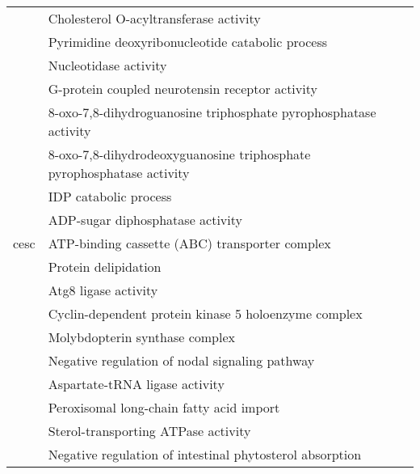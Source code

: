 \begin{appendices}
\begin{longtable}{lp{}}
									 & Cholesterol O-acyltransferase activity                                                          \\
									 & Pyrimidine deoxyribonucleotide catabolic process                                                \\
									 & Nucleotidase activity                                                                           \\
									 & G-protein coupled neurotensin receptor activity                                                 \\
									 & 8-oxo-7,8-dihydroguanosine triphosphate pyrophosphatase activity                                \\
									 & 8-oxo-7,8-dihydrodeoxyguanosine triphosphate pyrophosphatase activity                           \\
									 & IDP catabolic process                                                                           \\
									 & ADP-sugar diphosphatase activity                                                                \\
		\hline
		\gls{cesc}                   & ATP-binding cassette (ABC) transporter complex                                                  \\
									 & Protein delipidation                                                                            \\
									 & Atg8 ligase activity                                                                            \\
									 & Cyclin-dependent protein kinase 5 holoenzyme complex                                            \\
									 & Molybdopterin synthase complex                                                                  \\
									 & Negative regulation of nodal signaling pathway                                                  \\
									 & Aspartate-tRNA ligase activity                                                                  \\
									 & Peroxisomal long-chain fatty acid import                                                        \\
									 & Sterol-transporting ATPase activity                                                             \\
									 & Negative regulation of intestinal phytosterol absorption                                        \\

\end{longtable}
\end{appendices}
